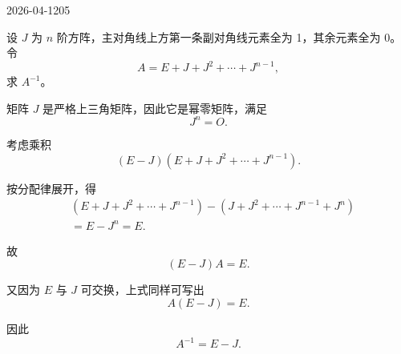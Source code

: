 \begin{mistake}{2026-04-12}{05}

\begin{problemcontent}
设 \(J\) 为 \(n\) 阶方阵，主对角线上方第一条副对角线元素全为 1，其余元素全为 0。令
\[
A=E+J+J^2+\cdots+J^{n-1},
\]
求 \(A^{-1}\)。

\end{problemcontent}

\begin{solutioncontent}
矩阵 \(J\) 是严格上三角矩阵，因此它是幂零矩阵，满足
\[
J^n=O.
\]

考虑乘积
\[
(E-J)(E+J+J^2+\cdots+J^{n-1}).
\]

按分配律展开，得
\[
\begin{aligned}
&(E+J+J^2+\cdots+J^{n-1})-(J+J^2+\cdots+J^{n-1}+J^n)\\
&=E-J^n=E.
\end{aligned}
\]

故
\[
(E-J)A=E.
\]

又因为 \(E\) 与 \(J\) 可交换，上式同样可写出
\[
A(E-J)=E.
\]

因此
\[
A^{-1}=E-J.
\]

\end{solutioncontent}


\end{mistake}
